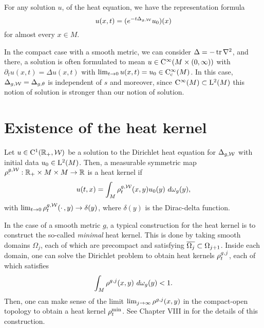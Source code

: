 \documentclass[a4paper, 12pt]{amsart}
\begin{document}
For any solution \(u\), of the heat equation, we have the representation formula
\[
u(x,t) = (e^{-t \Delta_{g,\cW}}u_0)(x)
\]
for almost every $x \in M$.
 
\begin{rem}
In the compact case with a smooth metric, we can consider $\Delta = -\tr \nabla^2$,
and there,  a solution is often formulated to mean $u \in \Ck{\infty}( M \times (0, \infty))$
with $\partial_t u(x,t) = \Delta u(x,t)$ with 
$\lim_{t \to 0} u(x,t) = u_0 \in \Ck[c]{\infty}(M)$.
In this case, $\Delta_{g,\cW} = \Delta_{g,\theta}$ is independent
of $s$ and moreover, since $\Ck{\infty}(M) \subset \Lp{2}(M)$
this notion of solution is stronger than our notion of solution.

\end{rem}

\section{Existence of the heat kernel}

\begin{defn}
Let $u \in \Ck{1}(\R_+, \cW)$ be a solution to the 
Dirichlet heat equation
for $\Delta_{g,\cW}$ with initial data $u_0 \in \Lp{2}(M)$. Then, a 
measurable symmetric map $\hk^{g,\cW}_{\mdot}: \R_+ \times M \times M \to \R$
is a heat kernel if 
$$u(t,x) = \int_{M} \hk^{g,\cW}_t(x,y) u_0(y)\ d\omega_g(y),$$
with $\lim_{t \to 0} \hk_t^{g,\cW}(\mdot,y) \to \delta(y)$, 
where $\delta(y)$ is the Dirac-delta function.
\end{defn}

In the case of a smooth metric $g$, a typical construction for
the heat kernel is to construct the so-called \emph{minimal} heat kernel.
This is done by taking smooth domains $\Omega_j$, 
each of which are precompact and satisfying $\close{\Omega_j} \subset \Omega_{j+1}$. 
Inside each domain, one can solve the Dirichlet problem
to obtain heat kernels $\hk^{g,j}_{t}$, each of which
satisfies 
$$ \int_{M} \hk^{g,j}(x,y)\ d\omega_g(y) < 1.$$
Then, one can make sense of the limit $\lim_{j \to \infty} \hk^{g,j}(x,y)$
in the compact-open topology to obtain a heat kernel $\hk^{\min}_t$.
See Chapter VIII in \cite{Chavel} for the details
of this construction.
\end{document}
